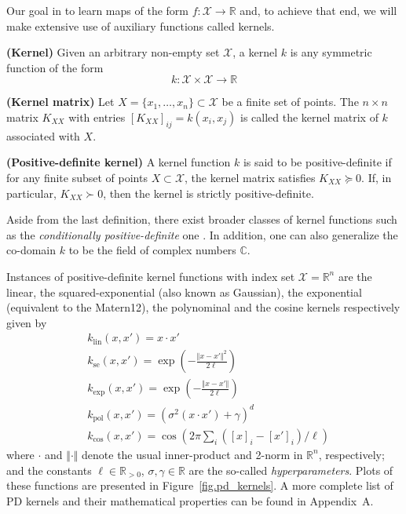 Our goal in to learn maps of the form $f: \mathcal{X} \rightarrow \mathbb{R}$ and, to achieve that end, we will make extensive use of auxiliary functions called kernels.

\begin{definition}
	\textbf{(Kernel)} Given an arbitrary non-empty set $\mathcal{X}$, a kernel $k$ is any symmetric function of the form
	\begin{equation}
		k: \mathcal{X} \times \mathcal{X} \rightarrow \mathbb{R}
	\end{equation}
\end{definition}

\begin{definition}
	\textbf{(Kernel matrix)} Let $X = \{x_1,\dots,x_n\} \subset \mathcal{X}$ be a finite set of points. The $n \times n$ matrix $K_{XX}$ with entries $[K_{XX}]_{ij} = k(x_i,x_j)$ is called the kernel matrix of $k$ associated with $X$.
\end{definition}

\begin{definition}
	\label{def.pd_kernel}
	\textbf{(Positive-definite kernel)} A kernel function $k$ is said to be positive-definite if for any finite subset of points $X \subset \mathcal{X}$, the kernel matrix satisfies $K_{XX} \succeq 0$. If, in particular, $K_{XX} \succ 0$, then the kernel is strictly positive-definite.
\end{definition}

\begin{remark}
	Aside from the last definition, there exist broader classes of kernel functions such as the \textit{conditionally positive-definite} one \cite[§2.4]{scholkopf2002learning}\cite[§8]{wendland2004scattered}. In addition, one can also generalize the co-domain $k$ to be the field of complex numbers $\mathbb{C}$.
\end{remark}

Instances of positive-definite kernel functions with index set $\mathcal{X} = \mathbb{R}^n$ are the linear, the squared-exponential (also known as Gaussian), the exponential (equivalent to the Matern12), the polynominal and the cosine kernels respectively given by
\begin{align}
	&k_\text{lin}(x,x') = x \cdot x' \\
	&k_\text{se}(x,x') = \exp\left(-\frac{\Vert x-x'\Vert^2}{2\ell}\right) \label{eq.se_kernel}\\
	&k_\text{exp}(x,x') = \exp\left(-\frac{\Vert x-x'\Vert}{2\ell}\right) \\
	&k_\text{pol}(x,x') = \left(\sigma^2 (x \cdot x') + \gamma \right)^d \\
	&k_\text{cos}(x,x') = \cos\left(2\pi \sum_i ([x]_i-[x']_i)/\ell \right)
\end{align}
where $\cdot$ and $\Vert \cdot \Vert$ denote the usual inner-product  and 2-norm in $\mathbb{R}^n$, respectively; and the constants $\ell \in \mathbb{R}_{>0}$, $\sigma, \gamma\in \mathbb{R}$ are the so-called \textit{hyperparameters}. Plots of these functions are presented in Figure~\ref{fig.pd_kernels}. A more complete list of PD kernels and their mathematical properties can be found in Appendix~A. 


